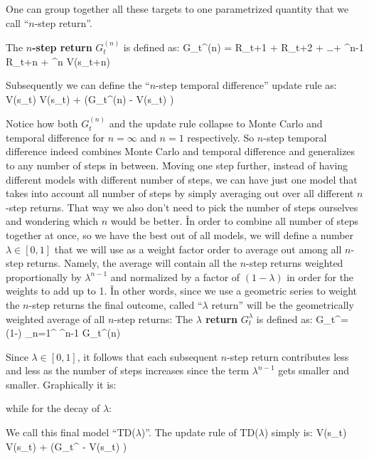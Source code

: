 One can group together all these targets to one parametrized quantity that we call ``$n$-step return''.

The \textbf{$n$-step return} $G_t^{(n)}$ is defined as:
\bse
G_t^{(n)} = R_{t+1} + \gamma R_{t+2} + \ldots + \gamma^{n-1} R_{t+n} + \gamma^{n} V(s_{t+n})
\ese
\ed

Subsequently we can define the ``$n$-step temporal difference'' update rule as:
\bse
V(s_t) \gets V(s_t) + \alpha \left(G_t^{(n)} - V(s_t) \right)
\ese

Notice how both $G_t^{(n)}$ and the update rule collapse to Monte Carlo and temporal difference for $n=\infty$ and
$n=1$ respectively. So $n$-step temporal difference indeed combines Monte Carlo and temporal difference and
generalizes to any number of steps in between. \v

Moving one step further, instead of having different models with different number of steps, we can have just one
model that takes into account all number of steps by simply averaging out over all different $n$-step returns. That
way we also don't need to pick the number of steps ourselves and wondering which $n$ would be better. \v

In order to combine all number of steps together at once, so we have the best out of all models, we will define a
number $\lambda \in [0,1]$ that we will use as a weight factor order to average out among all $n$-step returns.
Namely, the average will contain all the $n$-step returns weighted proportionally by $\lambda^{n-1}$ and normalized
by a factor of $(1-\lambda)$ in order for the weights to add up to 1. \v

In other words, since we use a geometric series to weight the $n$-step returns the final outcome, called ``$\lambda$
return'' will be the geometrically weighted average of all $n$-step returns:  The
\textbf{$\lambda$ return} $G_t^\lambda$ is defined as:
\bse
G_t^\lambda = (1-\lambda) \sum_{n=1}^{\infty} \lambda^{n-1} G_t^{(n)}
\ese
\ed

Since $\lambda \in [0,1]$, it follows that each subsequent $n$-step return contributes less and less as the number of
steps increases since the term $\lambda^{n-1}$ gets smaller and smaller. Graphically it is:


while for the decay of $\lambda$:


We call this final model ``TD($\lambda$)''. The update rule of TD($\lambda$) simply is:
\bse
V(s_t) \gets V(s_t) + \alpha \left(G_t^{\lambda} - V(s_t) \right)
\ese

